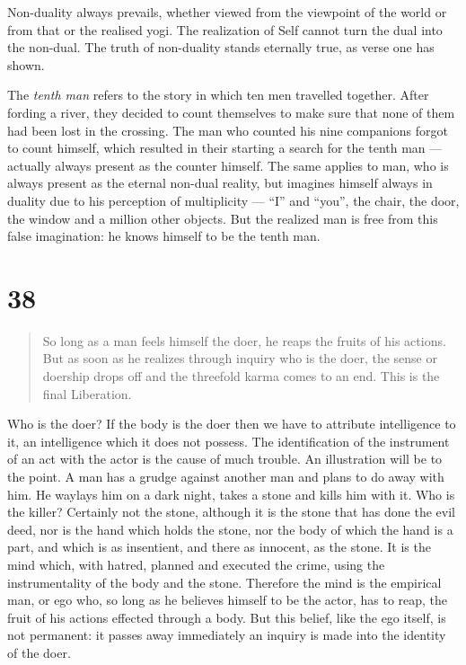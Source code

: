 \documentclass[12pt]{report}
\begin{document}
Non-duality always prevails, whether viewed from the viewpoint of the
world or from that or the realised yogi. The realization of Self
cannot turn the dual into the non-dual. The truth of non-duality
stands eternally true, as verse one has shown.

The \emph{tenth man} refers to the story in which ten men travelled
together. After fording a river, they decided to count themselves to
make sure that none of them had been lost in the crossing. The man who
counted his nine companions forgot to count himself, which resulted in
their starting a search for the tenth man --- actually always present
as the counter himself. The same applies to man, who is always present
as the eternal non-dual reality, but imagines himself always in
duality due to his perception of multiplicity --- ``I'' and ``you'',
the chair, the door, the window and a million other objects. But the
realized man is free from this false imagination: he knows himself to
be the tenth man.

\section{38}

\begin{quote}
  So long as a man feels himself the doer, he reaps the fruits of his
  actions. But as soon as he realizes through inquiry who is the doer,
  the sense or doership drops off and the threefold karma comes to an
  end. This is the final Liberation.
\end{quote}


Who is the doer? If the body is the doer then we have to attribute
intelligence to it, an intelligence which it does not possess. The
identification of the instrument of an act with the actor is the cause
of much trouble. An illustration will be to the point. A man has a
grudge against another man and plans to do away with him. He waylays
him on a dark night, takes a stone and kills him with it. Who is the
killer? Certainly not the stone,  although it is the stone that has
done the evil deed, nor is the hand which holds the stone, nor the
body of which the hand is a part, and which is as insentient, and
there as innocent, as the stone. It is the mind which, with hatred,
planned and executed the crime, using the instrumentality of the body
and the stone. Therefore the mind is the empirical man, or ego who, so
long as he believes himself to be the actor, has to reap, the fruit of
his actions effected through a body. But this belief, like the ego
itself, is not permanent: it passes away immediately an inquiry is
made into the identity of the doer.
\end{document}
